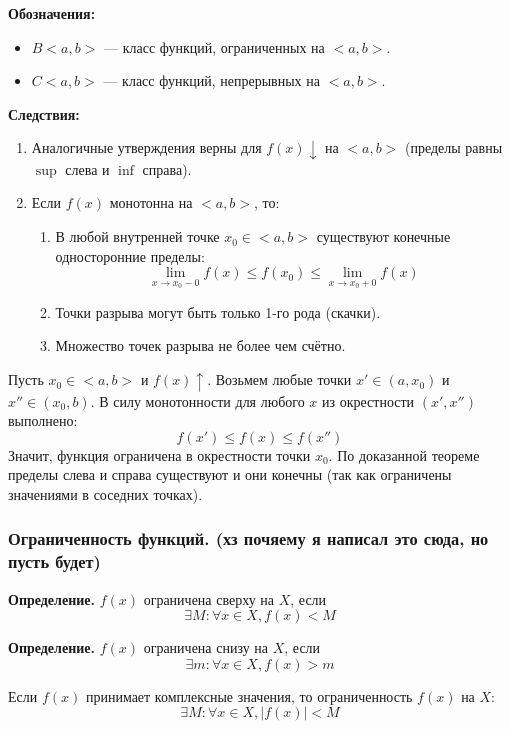 \textbf{Обозначения:}
\begin{itemize}
    \item $B<a,b>$ — класс функций, ограниченных на $<a, b>$.
    \item $C<a,b>$ — класс функций, непрерывных на $<a, b>$.
\end{itemize}

\textbf{Следствия:}
\begin{enumerate}
	\item Аналогичные утверждения верны для $f(x) \downarrow$ на $<a,b>$ (пределы равны $\sup$ слева и $\inf$ справа).
	\item Если $f(x)$ монотонна на $<a, b>$, то:
		\begin{enumerate}
			\item В любой внутренней точке $x_0 \in <a,b>$ существуют конечные односторонние пределы:
			\[ \lim_{x\to x_0-0} f(x) \le f(x_0) \le \lim_{x\to x_0+0} f(x) \]
			\item Точки разрыва могут быть только 1-го рода (скачки).
			\item Множество точек разрыва не более чем счётно.
		\end{enumerate}
\end{enumerate}

\begin{tcolorbox}[title=Доказательство конечности пределов во внутренней точке]
	Пусть $x_0 \in <a,b>$ и $f(x) \uparrow$.
	Возьмем любые точки $x' \in (a, x_0)$ и $x'' \in (x_0, b)$.
	В силу монотонности для любого $x$ из окрестности $(x', x'')$ выполнено:
	\[ f(x') \leq f(x) \leq f(x'') \]
	Значит, функция ограничена в окрестности точки $x_0$.
	По доказанной теореме пределы слева и справа существуют и они конечны (так как ограничены значениями в соседних точках).
\end{tcolorbox}

\subsubsection*{Ограниченность функций. (хз почяему я написал это сюда, но пусть будет)}
\begin{tcolorbox}
	\textbf{Определение.} $f(x)$ ограничена сверху на $X$, если
	\[ \exists M: \forall x \in X, f(x) < M \]
\end{tcolorbox}
\begin{tcolorbox}
	\textbf{Определение.} $f(x)$ ограничена снизу на $X$, если
	\[ \exists m: \forall x \in X, f(x) > m \]
\end{tcolorbox}
\begin{tcolorbox}
    Если $f(x)$ принимает комплексные значения, то ограниченность $f(x)$ на $X$:
    \[ \exists M: \forall x \in X, |f(x)| < M \]
\end{tcolorbox}

